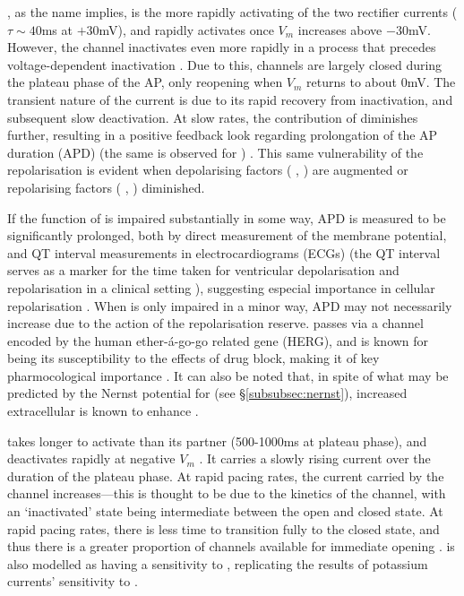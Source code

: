 \documentclass[../thesis-main.tex]{subfiles}
\begin{document}
\ikr{}, as the name implies, is the more rapidly activating of the two rectifier \K{} currents ($\tau\sim40$ms at $+30$mV), and rapidly activates once $V_m$ increases above $-30$mV. However, the channel inactivates even more rapidly in a process that precedes voltage-dependent inactivation \citep{Varro2011, Spector1996, Carmeliet2006}. Due to this, \ikr{} channels are largely closed during the plateau phase of the AP, only reopening when $V_m$ returns to about 0mV. The transient nature of the current is due to its rapid recovery from inactivation, and subsequent slow deactivation. At slow rates, the contribution of \ikr{} diminishes further, resulting in a positive feedback look regarding prolongation of the AP duration (APD) (the same is observed for \ikix{}) \citep{Virag2009}. This same vulnerability of the repolarisation is evident when depolarising factors (\eg{} \ina{}, \ica{}) are augmented or repolarising factors (\eg{} \iks{}, \ikix{}) diminished.

If the function of \ikr{} is impaired substantially in some way, APD is measured to be significantly prolonged, both by direct measurement of the membrane potential, and QT interval measurements in electrocardiograms (ECGs)  (the QT interval serves as a marker for the time taken for ventricular depolarisation and repolarisation in a clinical setting \citep{Yan1998}), suggesting especial importance in cellular repolarisation \citep{Varro2000, Lengyel2001, Jost2005}. When \ikr{} is only impaired in a minor way, APD may not necessarily increase due to the action of the repolarisation reserve. \ikr{} passes via a channel encoded by the human ether-\'a-go-go related gene (HERG), and is known for being its susceptibility to the effects of drug block, making it of key pharmocological importance \citep{Vandenberg2001, Haverkamp2000}. It can also be noted that, in spite of what may be predicted by the Nernst potential for \ikr{} (see \S\ref{subsubsec:nernst}), increased extracellular \K{} is known to enhance \ikr{} \citep{Sanguinetti1992, Yang1997}.

\iks{} takes longer to activate than its partner (500-1000ms at plateau phase), and deactivates rapidly at negative $V_m$ \citep{Jost2005, Varro2011}. It carries a slowly rising current over the duration of the plateau phase. At rapid pacing rates, the current carried by the \iks{} channel increases---this is thought to be due to the kinetics of the channel, with an `inactivated' state being intermediate between the open and closed state. At rapid pacing rates, there is less time to transition fully to the closed state, and thus there is a greater proportion of \iks{} channels available for immediate opening \citep{Silva2005}. \iks{} is also modelled as having a sensitivity to \cai{}, replicating the results of potassium currents' sensitivity to \cai{} \citep{Meech1975}.
\end{document}
